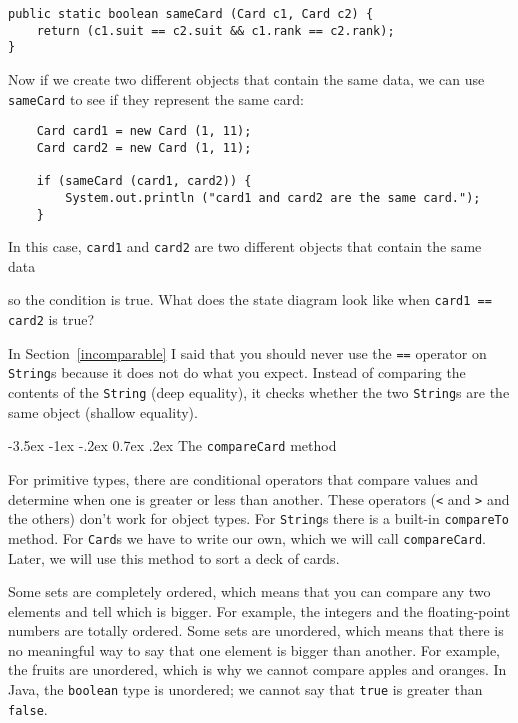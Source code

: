 \documentclass{book}
\makeatletter
\renewcommand{\section}{\@startsection 
    {section} {1} {0mm}%
    {-3.5ex \@plus -1ex \@minus -.2ex}%
    {0.7ex \@plus.2ex}%
    {\normalfont\Large\bfseries}}
\newcommand{\beforefig}{\vspace{1.3\parskip}}
\newcommand{\afterfig}{\vspace{-0.2\parskip}}
\newcommand{\myfig}[1]{
    \beforefig
    \centerline{\epsfig{#1,scale=0.8}}
    \afterfig
}
\makeatother
\begin{document}
\begin{verbatim}
public static boolean sameCard (Card c1, Card c2) {
    return (c1.suit == c2.suit && c1.rank == c2.rank);
}
\end{verbatim}
%
Now if we create two different objects that contain the same
data, we can use {\tt sameCard} to see if they represent the
same card:

\begin{verbatim}
    Card card1 = new Card (1, 11);
    Card card2 = new Card (1, 11);

    if (sameCard (card1, card2)) {
        System.out.println ("card1 and card2 are the same card.");
    }
\end{verbatim}
%
In this case, {\tt card1} and {\tt card2}
are two different objects that contain the same data

\myfig{figure=figs/card.eps}

so the condition is true.  What does the state diagram look like when
{\tt card1 == card2} is true?


In Section~\ref{incomparable} I said that you should never use the
{\tt ==} operator on {\tt String}s because it does not do what you
expect.  Instead of comparing the contents of the {\tt String}
(deep equality), it checks whether the two {\tt String}s are the
same object (shallow equality).


\section{The {\tt compareCard} method}

For primitive types, there are conditional operators that
compare values and determine when one is greater or less
than another.  These operators ({\tt <} and {\tt >} and the others)
don't work for object types.  For {\tt String}s there is
a built-in {\tt compareTo} method.  For {\tt Card}s we have
to write our own, which we will call {\tt compareCard}.
Later, we will use this method to sort a deck of cards.


Some sets are completely ordered, which means that you can
compare any two elements and tell which is bigger.  For
example, the integers and the floating-point numbers are
totally ordered.  Some sets are unordered, which means that
there is no meaningful way to say that one element is bigger
than another.  For example, the fruits are unordered, which
is why we cannot compare apples and oranges.  In Java,
the {\tt boolean} type is unordered; we cannot say that
{\tt true} is greater than {\tt false}.
\end{document}

